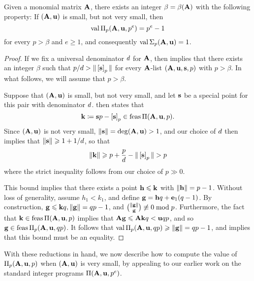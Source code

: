 \documentclass{amsart}
\begin{document}
\begin{theorem}
   \label{small not very small value: T}
   Given a monomial matrix $\mathbf{A}$, there exists an integer $\beta=\beta(\mathbf{A})$ with the following property\textup:
   If $(\mathbf{A}, \mathbf{u})$ is small, but not very small, then
   \[ \operatorname{val} \Pi_p(\mathbf{A}, \mathbf{u}, p^e) = p^e-1\]
   for every $p > \beta$ and $e \geq 1$, and consequently $\operatorname{val} \Sigma_p(\mathbf{A},\mathbf{u}) = 1$.
\end{theorem}

\begin{proof}
   If we fix a universal denominator $d$ for $\mathbf{A}$, then  implies that there exists an integer $\beta$ such that $p/d > \| \left[ \mathbf{s} \right]_p \|$ for every $\mathbf{A}$-list $(\mathbf{A},\mathbf{u},\mathbf{s}, p)$ with $p > \beta$.
   In what follows, we will assume that $p > \beta$.

   Suppose that $(\mathbf{A},\mathbf{u})$ is small, but not very small, and let $\mathbf{s}$ be a special point for this pair with denominator $d$.
    then states that
   \[ \mathbf{k} \coloneqq \mathbf{s}p-\left[ \mathbf{s} \right]_p \in \operatorname{feas} \Pi(\mathbf{A},\mathbf{u},p). \]
   Since $(\mathbf{A},\mathbf{u})$ is not very small, $\| \mathbf{s} \| = \operatorname{deg}(\mathbf{A},\mathbf{u}) > 1$, and our choice of $d$ then implies that $\| \mathbf{s} \| \geqslant 1 + 1/d$, so that
   \[\| \mathbf{k} \| \geqslant p + \frac{p}{d} - \| \left[ \mathbf{s} \right]_p \| > p\]
   where the strict inequality follows from our choice of $p \gg 0$.

   This bound implies that there exists a point $\mathbf{h} \leqslant \mathbf{k}$ with $\| \mathbf{h} \| = p-1$.
   Without loss of generality, assume $h_1 < k_1$, and define $\mathbf{g} = \mathbf{h}q + \mathbf{e}_1(q-1)$.
   By construction, $\mathbf{g} \leqslant \mathbf{k}q, \| \mathbf{g} \| = qp-1$, and $\binom{\| \mathbf{g} \|}{\mathbf{g}} \not\equiv 0 \bmod p$.
   Furthermore, the fact that $\mathbf{k} \in \operatorname{feas} \Pi(\mathbf{A},\mathbf{u},p)$ implies that $\mathbf{A}\mathbf{g} \leqslant \mathbf{A}{\mathbf{k}}q < \mathbf{u}qp$, and so $\mathbf{g} \in \operatorname{feas} \Pi_p(\mathbf{A},\mathbf{u},qp)$.
   It follows that $\operatorname{val} \Pi_p(\mathbf{A},\mathbf{u},qp) \geqslant \| \mathbf{g} \| = qp-1$, and  implies that this bound must be an equality.
\end{proof}

With these reductions in hand, we now describe how to compute the value of $\Pi_p(\mathbf{A}, \mathbf{u}, p)$ when $(\mathbf{A}, \mathbf{u})$ is very small,  by appealing to our earlier work on the standard integer programs $\Pi(\mathbf{A}, \mathbf{u}, p^e)$.
\end{document}
